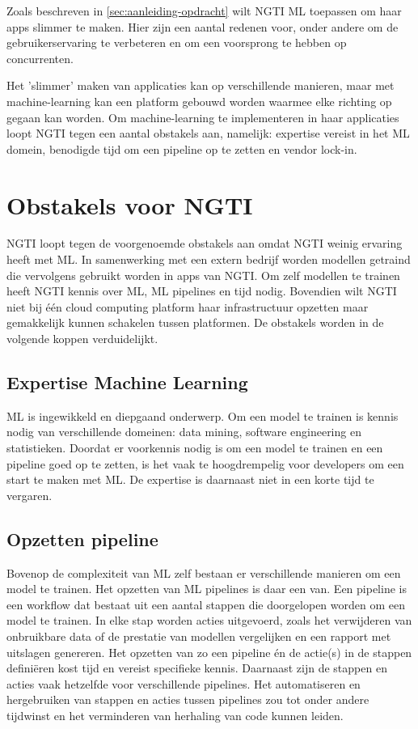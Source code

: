 Zoals beschreven in \autoref{sec:aanleiding-opdracht} wilt NGTI ML toepassen om haar apps slimmer te maken. Hier zijn een aantal redenen voor, onder andere om de gebruikerservaring te verbeteren en om een voorsprong te hebben op concurrenten.

Het 'slimmer' maken van applicaties kan op verschillende manieren, maar met machine-learning kan een platform gebouwd worden waarmee elke richting op gegaan kan worden. Om machine-learning te implementeren in haar applicaties loopt NGTI tegen een aantal obstakels aan, namelijk: expertise vereist in het ML domein, benodigde tijd om een pipeline op te zetten en vendor lock-in.

\section{Obstakels voor NGTI}\label{sec:obstakels-voor-ngti}
NGTI loopt tegen de voorgenoemde obstakels aan omdat NGTI weinig ervaring heeft met ML. In samenwerking met een extern bedrijf worden modellen getraind die vervolgens gebruikt worden in apps van NGTI. Om zelf modellen te trainen heeft NGTI kennis over ML, ML pipelines en tijd nodig. Bovendien wilt NGTI niet bij één cloud computing platform haar infrastructuur opzetten maar gemakkelijk kunnen schakelen tussen platformen. De obstakels worden in de volgende koppen verduidelijkt.

\subsection{Expertise Machine Learning}\label{subsec:expertise-machine-learning}
ML is ingewikkeld en diepgaand onderwerp. Om een model te trainen is kennis nodig van verschillende domeinen: data mining, software engineering en statistieken. Doordat er voorkennis nodig is om een model te trainen en een pipeline goed op te zetten, is het vaak te hoogdrempelig voor developers om een start te maken met ML. De expertise is daarnaast niet in een korte tijd te vergaren.

\subsection{Opzetten pipeline}\label{subsec:opzetten-pipeline}
Bovenop de complexiteit van ML zelf bestaan er verschillende manieren om een model te trainen. Het opzetten van ML pipelines is daar een van. Een pipeline is een workflow dat bestaat uit een aantal stappen die doorgelopen worden om een model te trainen. In elke stap worden acties uitgevoerd, zoals het verwijderen van onbruikbare data of de prestatie van modellen vergelijken en een rapport met uitslagen genereren. Het opzetten van zo een pipeline én de actie(s) in de stappen definiëren kost tijd en vereist specifieke kennis. Daarnaast zijn de stappen en acties vaak hetzelfde voor verschillende pipelines. Het automatiseren en hergebruiken van stappen en acties tussen pipelines zou tot onder andere tijdwinst en het verminderen van herhaling van code kunnen leiden.

